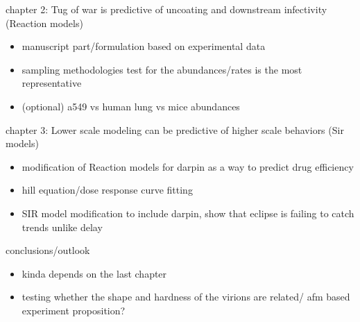chapter 2: Tug of war is predictive of uncoating and downstream infectivity (Reaction models)
\begin{itemize}
\item manuscript part/formulation based on experimental data
\item sampling methodologies test for the abundances/rates is the most representative
\item (optional) a549 vs human lung vs mice abundances
\end{itemize}

chapter 3: Lower scale modeling can be predictive of higher scale behaviors (Sir models)
\begin{itemize}
\item modification of Reaction models for darpin as a way to predict drug efficiency
\item hill equation/dose response curve fitting
\item SIR model modification to include darpin, show that eclipse is failing to catch trends unlike delay
\end{itemize}

conclusions/outlook
\begin{itemize}
\item kinda depends on the last chapter
\item testing whether the shape and hardness of the virions are related/ afm based experiment proposition?
\end{itemize}